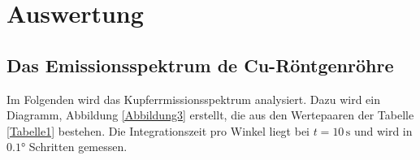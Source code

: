 \section{Auswertung} 

\subsection{Das Emissionsspektrum de Cu-Röntgenröhre}

\begin{flushleft}
    Im Folgenden wird das Kupferrmissionsspektrum analysiert. 
    Dazu wird ein Diagramm, Abbildung \ref{Abbildung3} erstellt, die aus den Wertepaaren der Tabelle \ref{Tabelle1} bestehen. 
    Die Integrationszeit pro Winkel liegt bei $t = 10\,\unit{\second}$ und wird in $0.1\unit{\degree}$ Schritten gemessen.
\end{flushleft}

